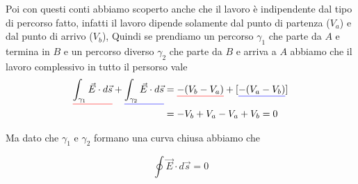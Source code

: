 \documentclass{rapport}
\def\mathunderline#1#2{\color{#1}\underline{{\color{black}#2}}\color{black}}
\begin{document}
Poi con questi conti abbiamo scoperto anche che il lavoro è indipendente dal tipo di percorso fatto, infatti il lavoro dipende solamente dal punto di partenza ($V_a$) e dal punto di arrivo ($V_b$), Quindi se prendiamo un percorso $\gamma_1$ che parte da $A$ e termina in $B$ e un percorso diverso $\gamma_2$ che parte da $B$ e arriva a $A$ abbiamo che il lavoro complessivo in tutto il persorso vale 
\begin{align*}
\mathunderline{red}{\int_{\gamma_1} \vec{E} \cdot d\vec{s}} +\mathunderline{blue}{\int_{\gamma_2} \vec{E} \cdot d\vec{s}} &= \mathunderline{red}{-(V_b-V_a)} + [ \mathunderline{blue}{- (V_a-V_b)}] \\
&=  -V_b+V_a - V_a+V_b = 0
\end{align*}

Ma dato che $\gamma_1$ e $\gamma_2$ formano una curva chiusa abbiamo che 

\[
\oint \vec{E} \cdot d\vec{s} = 0
\]
\end{document}
